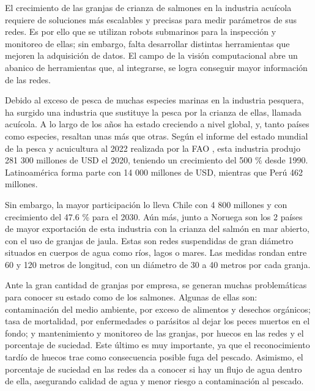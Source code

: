 

El crecimiento de las granjas de crianza de salmones en la industria acuícola requiere de soluciones más escalables y precisas para medir parámetros de sus redes. Es por ello que se utilizan robots submarinos para la inspección y monitoreo de ellas; sin embargo, falta desarrollar distintas herramientas que mejoren la adquisición de datos. El campo de la visión computacional abre un abanico de herramientas que, al integrarse, se logra conseguir mayor información de las redes. 


Debido al exceso de pesca de muchas especies marinas en la industria pesquera, ha surgido una industria que sustituye la pesca por la crianza de ellas, llamada acuícola. A lo largo de los años ha estado creciendo a nivel global, y, tanto países como especies, resaltan unas más que otras. Según el informe del estado mundial de la pesca y acuicultura al 2022 realizada por la FAO \cite{FAO}, esta industria produjo 281 300 millones de USD el 2020, teniendo un crecimiento del 500 \% desde 1990. Latinoamérica forma parte con 14 000 millones de USD, mientras que Perú 462 millones. 

Sin embargo, la mayor participación lo lleva Chile con 4 800 millones y con crecimiento del 47.6 \% para el 2030. Aún más, junto a Noruega son los 2 países de mayor exportación de esta industria con la crianza del salmón en mar abierto, con el uso de granjas de jaula. Estas son redes suspendidas de gran diámetro situados en cuerpos de agua como ríos, lagos o mares. Las medidas rondan entre 60 y 120 metros de longitud, con un diámetro de 30 a 40 metros por cada granja. 

Ante la gran cantidad de granjas por empresa, se generan muchas problemáticas para conocer su estado como de los salmones\cite{FAO}. Algunas de ellas son: contaminación del medio ambiente, por exceso de alimentos y desechos orgánicos; tasa de mortalidad, por enfermedades o parásitos al dejar los peces muertos en el fondo; y mantenimiento y monitoreo de las granjas, por huecos en las redes y el porcentaje de suciedad. Este último es muy importante, ya que el reconocimiento tardío de huecos trae como consecuencia posible fuga del pescado. Asimismo, el porcentaje de suciedad en las redes da a conocer si hay un flujo de agua dentro de ella, asegurando calidad de agua y menor riesgo a contaminación al pescado. 

